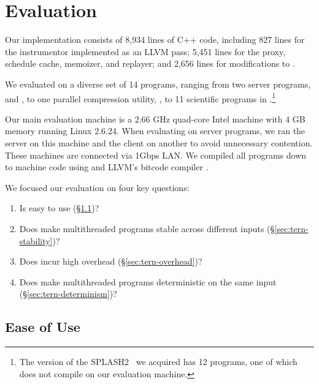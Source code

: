 \section{Evaluation}
\label{sec:tern-evaluation}

Our \tern implementation consists of 8,934 lines of C++ code, including 827
lines for the instrumentor implemented as an LLVM pass; 5,451 lines for
the proxy, schedule cache, memoizer, and replayer; and 2,656 lines for
modifications to \klee.

We evaluated \tern on a diverse set of 14 programs, ranging from two server
programs, \apache and \mysql, to one parallel compression utility, \pbzip, to
11 scientific programs in \splash.\footnote{The version of the
  SPLASH2~\cite{lu:bugbench} we acquired has 12 programs, one of which does
  not compile on our evaluation machine.}

Our main evaluation machine is a 2.66 GHz quad-core Intel machine with 4
GB memory running Linux 2.6.24.  When evaluating \tern on server programs, we
ran the server on this machine and the client on another to avoid
unnecessary contention.  These machines are connected via 1Gbps LAN.  We
compiled all programs down to machine code using  and
LLVM's bitcode compiler .

We focused our evaluation on four key questions:
\begin{enumerate}

\item Is \tern easy to use (\S\ref{sec:tern-ease-of-use})?

\item Does \tern make multithreaded programs stable across different inputs
  (\S\ref{sec:tern-stability})?

\item Does \tern incur high overhead (\S\ref{sec:tern-overhead})?

\item Does \tern make multithreaded programs deterministic on the same
  input (\S\ref{sec:tern-determinism})?

\end{enumerate}


\subsection{Ease of Use}\label{sec:tern-ease-of-use}


